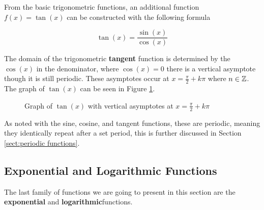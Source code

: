 From the basic trigonometric functions, an additional function $f(x) = \tan(x)$ can be constructed with the following formula

\begin{equation}
    \tan(x) = \frac{\sin(x)}{\cos(x)}
\end{equation}

The domain of the trigonometric \textbf{tangent} function is determined by the $\cos(x)$ in the denominator, where $\cos(x) = 0$ there is a vertical asymptote though it is still periodic. These asymptotes occur at $x = \frac{\pi}{2} + k\pi$ where $n \in \mathbb{Z}$. The graph of $\tan(x)$ can be seen in Figure \ref{fig:tangentgraph}.

\begin{figure}
    \centering
    \caption{Graph of $\tan(x)$ with vertical asymptotes at $x = \frac{\pi}{2} + k\pi$}
    \label{fig:tangentgraph}
\end{figure}

As noted with the sine, cosine, and tangent functions, these are periodic, meaning they identically repeat after a set period, this is further discussed in Section \ref{sect:periodic functions}.

\subsection{Exponential and Logarithmic Functions}\label{sect:exponential and logarithmic functions}
The last family of functions we are going to present in this section are the \textbf{exponential} and \textbf{logarithmic}functions.

